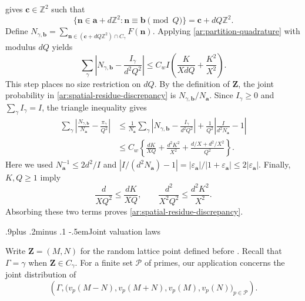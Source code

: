 \documentclass[twoside]{aomart}
\makeatletter
\theoremstyle{paperplain}
\theoremstyle{paperdefinition}
\renewcommand\subsection{\@startsection{subsection}{2}{\z@}
  {.9\baselineskip plus .2\baselineskip minus .1\baselineskip}
  {-.5em}{\normalfont\bfseries}}
\renewenvironment{proof}[1][\proofname]{\par\pushQED{\qed}%
  \normalfont\topsep6\p@\@plus3\p@\relax\trivlist
  \item[\hskip\labelsep\itshape #1\@addpunct{.}]\ignorespaces
}{\popQED\endtrivlist\@endpefalse}
\newcommand{\Z}{\mathbb Z}
\numberwithin{equation}{section}
\makeatother
\begin{document}
\begin{proof}
gives $\mathbf c\in\Z^2$ such that
\begin{equation}
 \{\mathbf n\in\mathbf a+d\Z^2:
                  \mathbf n\equiv\mathbf b\pmod Q\}
       =\mathbf c+dQ\Z^2.
\end{equation}
Define
$N_{\gamma,\mathbf b}
 =\sum_{\mathbf n\in(\mathbf c+dQ\Z^2)\cap C_\gamma}F(\mathbf n)$.
Applying \eqref{ar:partition-quadrature} with modulus $dQ$ yields
\begin{equation}
 \sum_\gamma\left|N_{\gamma,\mathbf b}
                         -\frac{I_\gamma}{d^2Q^2}\right|
 \le C_w I\left(\frac K{XdQ}+\frac{K^2}{X^2}\right).
\end{equation}
This step places no size restriction on $dQ$.
By the definition of $\mathbf Z$, the joint probability in
\eqref{ar:spatial-residue-discrepancy} is
$N_{\gamma,\mathbf b}/N_{\mathbf a}$.
Since $I_\gamma\ge0$ and $\displaystyle \sum_\gamma I_\gamma=I$,
the triangle inequality gives
\begin{equation}
 \begin{aligned}
 \sum_\gamma\left|
   \frac{N_{\gamma,\mathbf b}}{N_{\mathbf a}}
                       -\frac{\pi_\gamma}{Q^2}\right|
 &\le\frac1{N_{\mathbf a}}\sum_\gamma
   \left|N_{\gamma,\mathbf b}-\frac{I_\gamma}{d^2Q^2}\right|
   +\frac1{Q^2}\left|\frac I{d^2N_{\mathbf a}}-1\right|\\
 &\le C_w\left\{\frac{dK}{XQ}+\frac{d^2K^2}{X^2}
                +\frac{d/X+d^2/X^2}{Q^2}\right\}.
 \end{aligned}
\end{equation}
Here we used $N_{\mathbf a}^{-1}\le2d^2/I$ and
$|I/(d^2N_{\mathbf a})-1|
 =|\varepsilon_{\mathbf a}|/|1+\varepsilon_{\mathbf a}|
 \le2|\varepsilon_{\mathbf a}|$.
Finally, $K,Q\ge1$ imply
\begin{equation}
 \frac d{XQ^2}\le\frac{dK}{XQ},\qquad
 \frac{d^2}{X^2Q^2}\le\frac{d^2K^2}{X^2}.
\end{equation}
Absorbing these two terms proves
\eqref{ar:spatial-residue-discrepancy}.

\end{proof}
\subsection{Joint valuation laws}

Write $\mathbf Z=(M,N)$ for the random lattice point defined
before .
Recall that $\Gamma=\gamma$ when $\mathbf Z\in C_\gamma$.
For a finite set $\mathcal P$ of primes, our application concerns
the joint distribution of
\begin{equation*}
 \left(\Gamma,
 \bigl(v_p(M-N),v_p(M+N),v_p(M),v_p(N)\bigr)_{p\in\mathcal P}
 \right).
 \end{equation*}
\end{document}
